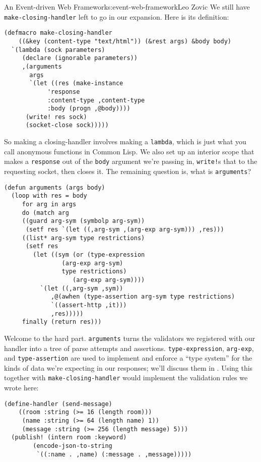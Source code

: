 \begin{aosachapter}{An Event-driven Web Framework}{s:event-web-framework}{Leo Zovic}
We still have \texttt{make-closing-handler} left to go in our expansion.
Here is its definition:

\begin{verbatim}
(defmacro make-closing-handler
    ((&key (content-type "text/html")) (&rest args) &body body)
  `(lambda (sock parameters)
     (declare (ignorable parameters))
     ,(arguments
       args
       `(let ((res (make-instance
            'response
            :content-type ,content-type
            :body (progn ,@body))))
      (write! res sock)
      (socket-close sock)))))
\end{verbatim}

So making a closing-handler involves making a \texttt{lambda}, which is
just what you call anonymous functions in Common Lisp. We also set up an
interior scope that makes a \texttt{response} out of the \texttt{body}
argument we're passing in, \texttt{write!}s that to the requesting
socket, then closes it. The remaining question is, what is
\texttt{arguments}?

\begin{verbatim}
(defun arguments (args body)
  (loop with res = body
     for arg in args
     do (match arg
     ((guard arg-sym (symbolp arg-sym))
      (setf res `(let ((,arg-sym ,(arg-exp arg-sym))) ,res)))
     ((list* arg-sym type restrictions)
      (setf res
        (let ((sym (or (type-expression
                (arg-exp arg-sym)
                type restrictions)
                   (arg-exp arg-sym))))
          `(let ((,arg-sym ,sym))
             ,@(awhen (type-assertion arg-sym type restrictions)
             `((assert-http ,it)))
             ,res)))))
     finally (return res)))
\end{verbatim}

Welcome to the hard part. \texttt{arguments} turns the validators we
registered with our handler into a tree of parse attempts and
assertions. \texttt{type-expression}, \texttt{arg-exp}, and
\texttt{type-assertion} are used to implement and enforce a ``type
system'' for the kinds of data we're expecting in our responses; we'll
discuss them in . Using this together
with \texttt{make-closing-handler} would implement the validation rules
we wrote here:

\begin{verbatim}
(define-handler (send-message)
    ((room :string (>= 16 (length room)))
     (name :string (>= 64 (length name) 1))
     (message :string (>= 256 (length message) 5)))
  (publish! (intern room :keyword)
        (encode-json-to-string
         `((:name . ,name) (:message . ,message)))))
\end{verbatim}


\end{aosachapter}
